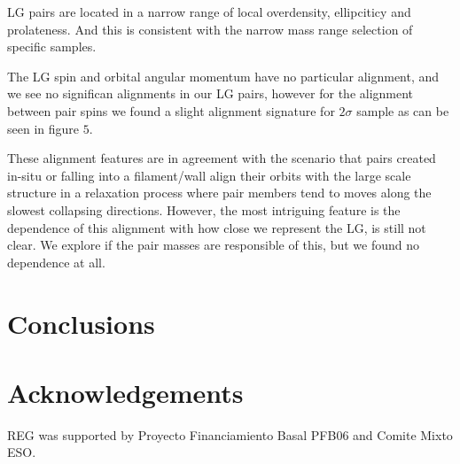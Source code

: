 \documentclass{emulateapj}
\begin{document}
LG pairs are located in a narrow range of local overdensity, ellipciticy and prolateness.
And this is consistent with the narrow mass range selection of specific samples.

The LG spin and orbital angular momentum have no particular alignment,
and we see no significan alignments in our LG pairs, however for the alignment
between pair spins we found a slight alignment signature for $2\sigma$ sample as
can be seen in figure $5$.

These alignment features are in agreement with the scenario that pairs 
created in-situ or falling into a filament/wall align their orbits with 
the large scale structure in a relaxation process where pair members
tend to moves along the slowest collapsing directions.
However, the most intriguing feature is the dependence of this alignment
with how close we represent the LG, is still not clear.
We explore if the pair masses are responsible of this, but we found 
no dependence at all.


\section{Conclusions}
\label{sec:conclusions}


\section*{Acknowledgements}
REG was supported by Proyecto Financiamiento Basal PFB06 and Comite Mixto ESO.


 
\end{document}
